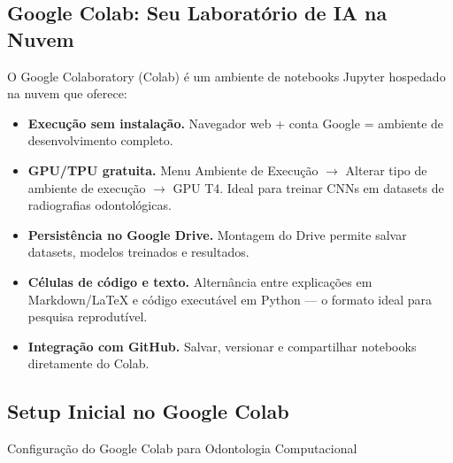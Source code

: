 \subsection{Google Colab: Seu Laboratório de IA na Nuvem}

O Google Colaboratory (Colab)  é um ambiente de notebooks Jupyter hospedado na nuvem que oferece:

\begin{itemize}
    \item \textbf{Execução sem instalação.} Navegador web + conta Google = ambiente de desenvolvimento completo.
    \item \textbf{GPU/TPU gratuita.} Menu Ambiente de Execução $\rightarrow$ Alterar tipo de ambiente de execução $\rightarrow$ GPU T4. Ideal para treinar CNNs em datasets de radiografias odontológicas.
    \item \textbf{Persistência no Google Drive.} Montagem do Drive permite salvar datasets, modelos treinados e resultados.
    \item \textbf{Células de código e texto.} Alternância entre explicações em Markdown/LaTeX e código executável em Python — o formato ideal para pesquisa reprodutível.
    \item \textbf{Integração com GitHub.} Salvar, versionar e compartilhar notebooks diretamente do Colab.
\end{itemize}

\subsection{Setup Inicial no Google Colab}

\begin{pratica}{Configuração do Google Colab para Odontologia Computacional}
\end{pratica}

